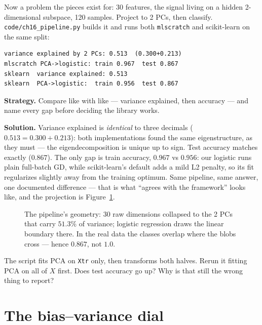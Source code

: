 Now a problem the pieces exist for: 30 features, the
signal living on a hidden 2-dimensional subspace, 120 samples.
Project to 2 PCs, then classify. \texttt{code/ch16\_pipeline.py}
builds it and runs both \texttt{mlscratch} and scikit-learn on the
same split:

\begin{lstlisting}[caption={\ttfamily code/ch16\_pipeline.py run ---
our library vs.\ scikit-learn, same split}]
variance explained by 2 PCs: 0.513  (0.300+0.213)
mlscratch PCA->logistic: train 0.967  test 0.867
sklearn  variance explained: 0.513
sklearn  PCA->logistic:  train 0.956  test 0.867
\end{lstlisting}

\begin{example}\label{ex:pipe}
\textbf{Strategy.} Compare like with like --- variance explained,
then accuracy --- and name every gap before deciding the library
works.

\textbf{Solution.} Variance explained is \emph{identical} to three
decimals ($0.513=0.300+0.213$): both implementations found the same
eigenstructure, as they must --- the eigendecomposition is unique up
to sign. Test accuracy matches exactly ($0.867$). The only gap is
train accuracy, $0.967$ vs $0.956$: our logistic runs plain
full-batch GD, while scikit-learn's default adds a mild L2 penalty,
so its fit regularizes slightly away from the training optimum. Same
pipeline, same answer, one documented difference --- that is what
``agrees with the framework'' looks like, and the projection is
Figure~\ref{fig:pcapipe}.
\end{example}

\begin{figure}[htbp]
\centering

\caption{The pipeline's geometry: 30 raw dimensions collapsed to the
2 PCs that carry $51.3\%$ of variance; logistic regression draws the
linear boundary there. In the real data the classes overlap where
the blobs cross --- hence $0.867$, not $1.0$.}
\label{fig:pcapipe}
\end{figure}

\begin{exercise}[hard]
The script fits PCA on \texttt{Xtr} only, then transforms both
halves. Rerun it fitting PCA on all of $X$ first. Does test accuracy
go up? Why is that still the wrong thing to report?
\end{exercise}

\section{The bias--variance dial}\label{sec:biasvar}

